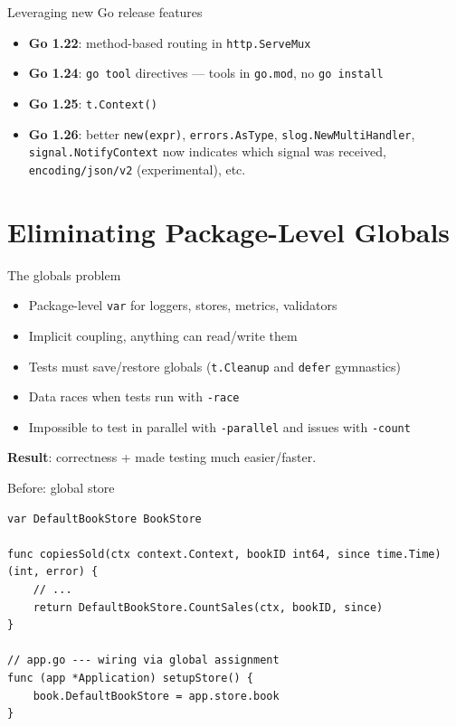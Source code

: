\documentclass[aspectratio=169,11pt]{beamer}
\begin{document}
\begin{frame}{Leveraging new Go release features}
  \begin{itemize}
    \setlength\itemsep{6pt}
    \item \textbf{Go 1.22}: method-based routing in \texttt{http.ServeMux}
    \item \textbf{Go 1.24}: \texttt{go tool} directives --- tools in \texttt{go.mod}, no \texttt{go install}
    \item \textbf{Go 1.25}: \texttt{t.Context()}
    \item \textbf{Go 1.26}: better \texttt{new(expr)}, \texttt{errors.AsType}, \texttt{slog.NewMultiHandler}, \texttt{signal.NotifyContext} now indicates which signal was received, \texttt{encoding/json/v2} (experimental), etc.
  \end{itemize}
\end{frame}

\section{Eliminating Package-Level Globals}

\begin{frame}{The globals problem}
  \begin{itemize}
    \setlength\itemsep{5pt}
    \item Package-level \texttt{var} for loggers, stores, metrics, validators
    \item Implicit coupling, anything can read/write them
    \item Tests must save/restore globals (\texttt{t.Cleanup} and \texttt{defer} gymnastics)
    \item Data races when tests run with \texttt{-race}
    \item Impossible to test in parallel with \texttt{-parallel} and issues with \texttt{-count}
  \end{itemize}

  \vspace{6pt}
  \textbf{Result}: correctness + made testing much easier/faster.
\end{frame}

\begin{frame}[fragile]{Before: global store}
\begin{lstlisting}
var DefaultBookStore BookStore

func copiesSold(ctx context.Context, bookID int64, since time.Time) (int, error) {
	// ...
	return DefaultBookStore.CountSales(ctx, bookID, since)
}

// app.go --- wiring via global assignment
func (app *Application) setupStore() {
	book.DefaultBookStore = app.store.book
}
\end{lstlisting}
\end{frame}
\end{document}
